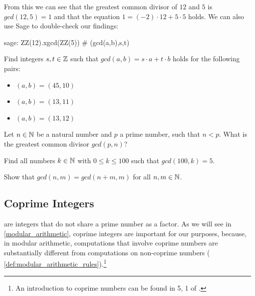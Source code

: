 \begin{example}

From this we can see that the greatest common divisor of $12$ and $5$ is $ gcd (12, 5) = 1 $ and that the equation $ 1 = (-2) \cdot 12 + 5 \cdot 5 $ holds. We can also use  Sage to double-check our findings:
\begin{sagecommandline}
sage: ZZ(12).xgcd(ZZ(5)) # (gcd(a,b),s,t)
\end{sagecommandline}
\end{example}
\begin{exercise}
\label{exercise:extended_Euclidean_division_1}
Find integers $s,t\in\mathbb{Z}$ such that $gcd(a,b)= s\cdot a +t\cdot b$ holds for the following pairs:
\begin{itemize}\compactlist{}
\item $(a,b) = (45,10)$
\item $(a,b)=(13,11)$
\item $(a,b)=(13,12)$
\end{itemize}
\end{exercise}
\begin{exercise}
\label{exercise_towards_counting_numbers}
Let $n\in \mathbb{N}$ be a natural number and $p$ a prime number, such that $n<p$. What is the greatest common divisor $gcd(p,n)$?
\end{exercise}
\begin{exercise}
Find all numbers $k\in\mathbb{N}$ with $0\leq k \leq 100$ such that $gcd(100,k) = 5$.
\end{exercise}
\begin{exercise}
Show that $gcd(n,m) = gcd(n+m,m)$ for all $n,m\in\mathbb{N}$.
\end{exercise}
\subsection{Coprime Integers}
\label{def:coprime_integers}
 are integers that do not share a prime number as a factor. As we will see in \secname{} \ref{modular_arithmetic}, coprime integers are important for our purposes, because, in modular arithmetic, computations that involve coprime numbers are substantially different from computations on non-coprime numbers ( \ref{def:modular_arithmetic_rules}).\footnote{An introduction to coprime numbers can be found in \chaptname{} 5, \secname{} 1 of \cite{hardy-2008}.}

